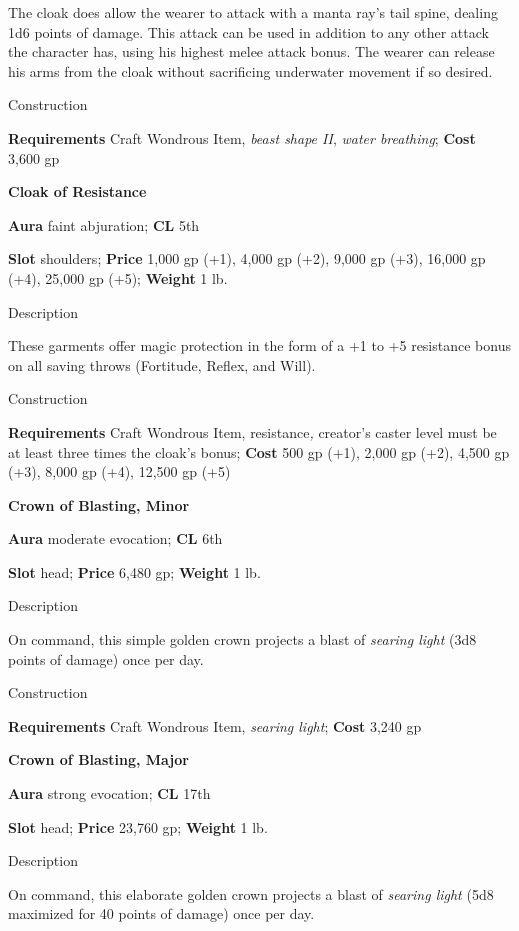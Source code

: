The cloak does allow the wearer to attack with a manta ray's tail spine, dealing 1d6 points of damage. This attack can be used in addition to any other attack the character has, using his highest melee attack bonus. The wearer can release his arms from the cloak without sacrificing underwater movement if so desired. 
				
Construction
				
\textbf{Requirements} Craft Wondrous Item, \textit{beast shape II}, \textit{water breathing}; \textbf{Cost }3,600 gp
				
\textbf{Cloak of Resistance}
				
\textbf{Aura} faint abjuration;\textbf{ CL }5th
				
\textbf{Slot} shoulders; \textbf{Price} 1,000 gp (+1), 4,000 gp (+2), 9,000 gp (+3), 16,000 gp (+4), 25,000 gp (+5); \textbf{Weight} 1 lb.
				
Description
				
These garments offer magic protection in the form of a +1 to +5 resistance bonus on all saving throws (Fortitude, Reflex, and Will). 
				
Construction
				
\textbf{Requirements} Craft Wondrous Item, resistance\textit{,} creator's caster level must be at least three times the cloak's bonus; \textbf{Cost }500 gp (+1), 2,000 gp (+2), 4,500 gp (+3), 8,000 gp (+4), 12,500 gp (+5)
				
\textbf{Crown of Blasting, Minor}
				
\textbf{Aura} moderate evocation; \textbf{CL} 6th
				
\textbf{Slot }head; \textbf{Price} 6,480 gp; \textbf{Weight} 1 lb.
				
Description
				
On command, this simple golden crown projects a blast of \textit{searing light }(3d8 points of damage) once per day.
				
Construction
				
\textbf{Requirements }Craft Wondrous Item, \textit{searing light}; \textbf{Cost} 3,240 gp
				
\textbf{Crown of Blasting, Major}
				
\textbf{Aura} strong evocation; \textbf{CL} 17th
				
\textbf{Slot }head; \textbf{Price} 23,760 gp; \textbf{Weight} 1 lb.
				
Description
				
On command, this elaborate golden crown projects a blast of \textit{searing light }(5d8 maximized for 40 points of damage) once per day.
				
